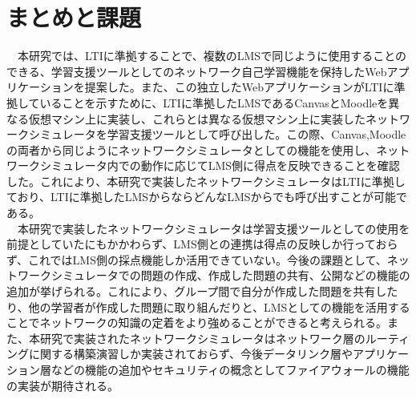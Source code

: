 \section{まとめと課題}
\label{tag:summary}
　本研究では、LTIに準拠することで、複数のLMSで同じように使用することのできる、学習支援ツールとしてのネットワーク自己学習機能を保持したWebアプリケーションを提案した。また、この独立したWebアプリケーションがLTIに準拠していることを示すために、LTIに準拠したLMSであるCanvasとMoodleを異なる仮想マシン上に実装し、これらとは異なる仮想マシン上に実装したネットワークシミュレータを学習支援ツールとして呼び出した。この際、Canvas,Moodleの両者から同じようにネットワークシミュレータとしての機能を使用し、ネットワークシミュレータ内での動作に応じてLMS側に得点を反映できることを確認した。これにより、本研究で実装したネットワークシミュレータはLTIに準拠しており、LTIに準拠したLMSからならどんなLMSからでも呼び出すことが可能である。\\
　本研究で実装したネットワークシミュレータは学習支援ツールとしての使用を前提としていたにもかかわらず、LMS側との連携は得点の反映しか行っておらず、これではLMS側の採点機能しか活用できていない。今後の課題として、ネットワークシミュレータでの問題の作成、作成した問題の共有、公開などの機能の追加が挙げられる。これにより、グループ間で自分が作成した問題を共有したり、他の学習者が作成した問題に取り組んだりと、LMSとしての機能を活用することでネットワークの知識の定着をより強めることができると考えられる。また、本研究で実装されたネットワークシミュレータはネットワーク層のルーティングに関する構築演習しか実装されておらず、今後データリンク層やアプリケーション層などの機能の追加やセキュリティの概念としてファイアウォールの機能の実装が期待される。
